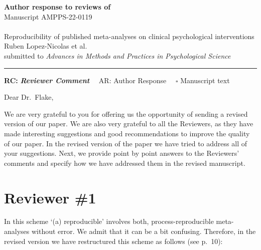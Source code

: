 \documentclass[draft]{article}
\begin{document}
{\Large\bf Author response to reviews of}\\[1em]
Manuscript AMPPS-22-0119\\ \\
{\Large Reproducibility of published meta-analyses on clinical psychological interventions}\\[1em]
{Ruben Lopez-Nicolas et al.}\\
{submitted to \it Advances in Methods and Practices in Psychological Science }\\
\hrule

\hfill {\bfseries RC:} \textbf{\textit{Reviewer Comment}}\(\quad\) AR: Author Response \(\quad\square\) Manuscript text

\vspace{2em}

Dear Dr.~Flake,

We are very grateful to you for offering us the opportunity of sending a revised version of our paper. We are also very grateful to all the Reviewers, as they have made interesting suggestions and good recommendations to improve the quality of our paper.
In the revised version of the paper we have tried to address all of your suggestions. Next, we provide point by point answers to the Reviewers' comments and specify how we have addressed them in the revised manuscript.

\newpage

\hypertarget{reviewer-1}{%
\section{Reviewer \#1}\label{reviewer-1}}


In this scheme `(a) reproducible' involves both, process-reproducible meta-analyses without error. We admit that it can be a bit confusing. Therefore, in the revised version we have restructured this scheme as follows (see p.~10):
\end{document}
